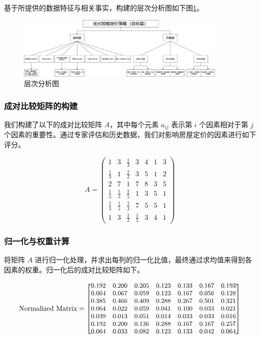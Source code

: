 \documentclass[12pt]{article}
\begin{document}
\begin{CJK}{UTF8}{gbsn}
	基于所提供的数据特征与相关事实，构建的层次分析图如下图\ref{fig:15}。
	
	\begin{figure}[H]
		\centering
		\includegraphics[width=0.9\textwidth]{pic/15.png} %
		\caption{层次分析图}
		\label{fig:15}
	\end{figure}
	
	
	
	\subsubsection{成对比较矩阵的构建}
	我们构建了以下的成对比较矩阵 $A$，其中每个元素 $a_{ij}$ 表示第 $i$ 个因素相对于第 $j$ 个因素的重要性。通过专家评估和历史数据，我们对影响房屋定价的因素进行如下评分。
	
	\begin{equation}
	A = \begin{pmatrix}
		1 & 3 & \frac{1}{3} & 3 & 4 & 1 & 3 \\
		\frac{1}{3} & 1 & \frac{1}{2} & 3 & 5 & 1 & 2 \\
		2 & 7 & 1 & 7 & 8 & 3 & 5 \\
		\frac{1}{3} & \frac{1}{3} & \frac{1}{5} & 1 & 3 & 5 & 1 \\
		\frac{1}{3} & \frac{1}{5} & \frac{1}{3} & 7 & 5 & 5 & 1 \\
		1 & 3 & \frac{1}{2} & \frac{1}{5} & 3 & 4 & 1
	\end{pmatrix}
	\end{equation}
	
	\subsubsection{归一化与权重计算}
	将矩阵 $A$ 进行归一化处理，并求出每列的归一化比值，最终通过求均值来得到各因素的权重。归一化后的成对比较矩阵如下。
	
	\begin{equation}
		\text{Normalized Matrix} =
		\small
		\begin{bmatrix}
			0.192 & 0.200 & 0.205 & 0.123 & 0.133 & 0.167 & 0.193 \\
			0.064 & 0.067 & 0.059 & 0.123 & 0.167 & 0.056 & 0.128 \\
			0.385 & 0.466 & 0.409 & 0.288 & 0.267 & 0.501 & 0.321 \\
			0.064 & 0.022 & 0.059 & 0.041 & 0.100 & 0.033 & 0.021 \\
			0.039 & 0.013 & 0.051 & 0.014 & 0.033 & 0.033 & 0.016 \\
			0.192 & 0.200 & 0.136 & 0.288 & 0.167 & 0.167 & 0.257 \\
			0.064 & 0.033 & 0.082 & 0.123 & 0.133 & 0.042 & 0.064
		\end{bmatrix}
	\end{equation}
	

\end{CJK}
\end{document}
